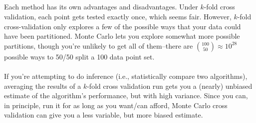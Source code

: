 \documentclass[12pt,onecolumn,a4paper]{article}
\begin{document}
\subsection{}
Each method has its own advantages and disadvantages. Under $k$-fold cross validation, each point gets tested exactly once, which seems fair. However, $k$-fold cross-validation only explores a few of the possible ways that your data could have been partitioned. Monte Carlo lets you explore somewhat more possible partitions, though you're unlikely to get all of them--there are $\binom{100}{50} \approx 10^{28}$ possible ways to 50/50 split a 100 data point set. 
\\ \\
If you're attempting to do inference (i.e., statistically compare two algorithms), averaging the results of a $k$-fold cross validation run gets you a (nearly) unbiased estimate of the algorithm's performance, but with high variance. Since you can, in principle, run it for as long as you want/can afford, Monte Carlo cross validation can give you a less variable, but more biased estimate.
\end{document}

